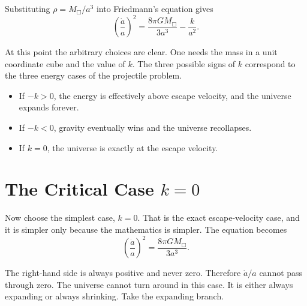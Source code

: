 Substituting \(\rho=M_{\Box}/a^3\) into Friedmann's equation gives
\begin{equation}
\left(\frac{\dot a}{a}\right)^2=\frac{8\pi G M_{\Box}}{3a^3}-\frac{k}{a^2}.
\end{equation}

At this point the arbitrary choices are clear. One needs the mass in a unit coordinate cube and the value of \(k\). The three possible signs of \(k\) correspond to the three energy cases of the projectile problem.

\begin{itemize}
\item If \(-k>0\), the energy is effectively above escape velocity, and the universe expands forever.
\item If \(-k<0\), gravity eventually wins and the universe recollapses.
\item If \(k=0\), the universe is exactly at the escape velocity.
\end{itemize}

\begin{classroomqa}
\end{classroomqa}

\section{The Critical Case \(k=0\)}

Now choose the simplest case, \(k=0\). That is the exact escape-velocity case, and it is simpler only because the mathematics is simpler. The equation becomes
\begin{equation}
\left(\frac{\dot a}{a}\right)^2=\frac{8\pi G M_{\Box}}{3a^3}.
\end{equation}

The right-hand side is always positive and never zero. Therefore \(\dot a/a\) cannot pass through zero. The universe cannot turn around in this case. It is either always expanding or always shrinking. Take the expanding branch.

